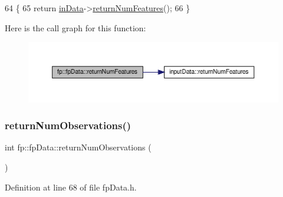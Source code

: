 \begin{DoxyCode}
64                                           \{
65                 \textcolor{keywordflow}{return} \hyperlink{classfp_1_1fpData_a49d7c3f58bcf88843c25b1b0c9714ebe}{inData}->\hyperlink{classinputData_a8fbb9ac952f73f65295eeb9bf8c3b01a}{returnNumFeatures}();
66             \}
\end{DoxyCode}
Here is the call graph for this function\+:\nopagebreak
\begin{figure}[H]
\begin{center}
\leavevmode
\includegraphics[width=350pt]{classfp_1_1fpData_a95088e33b280e5c82b3543033d8852e1_cgraph}
\end{center}
\end{figure}
\mbox{\label{classfp_1_1fpData_a9056a8c0e7e48fe9aa591269064ecc43}} 
\subsubsection{\texorpdfstring{return\+Num\+Observations()}{returnNumObservations()}}
{\footnotesize\ttfamily int fp\+::fp\+Data\+::return\+Num\+Observations (\begin{DoxyParamCaption}{ }\end{DoxyParamCaption})\hspace{0.3cm}{\ttfamily [inline]}}



Definition at line 68 of file fp\+Data.\+h.



